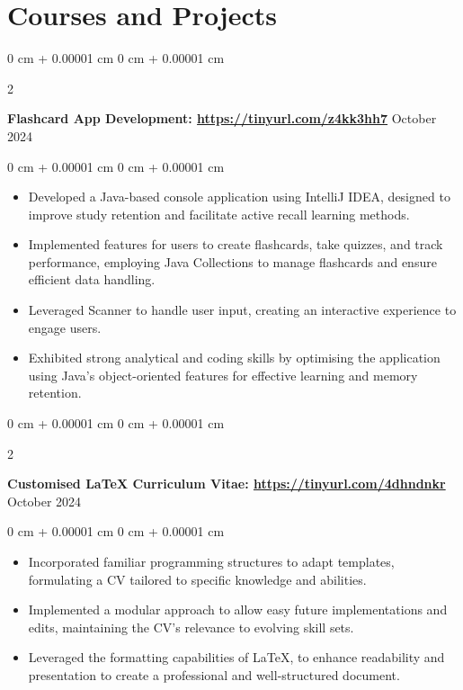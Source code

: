 \documentclass[10pt, letterpaper]{article}
\newenvironment{highlights}{
    \begin{itemize}[
        topsep=0.10 cm,
        parsep=0.10 cm,
        partopsep=0pt,
        itemsep=0pt,
        leftmargin=0 cm + 10pt
    ]
}{
    \end{itemize}
} %
\newenvironment{onecolentry}{
    \begin{adjustwidth}{
        0 cm + 0.00001 cm
    }{
        0 cm + 0.00001 cm
    }
}{
    \end{adjustwidth}
} %
\newenvironment{twocolentry}[2][]{
    \onecolentry
    \def\secondColumn{#2}
    \setcolumnwidth{\fill, 4.5 cm}
    \begin{paracol}{2}
}{
    \switchcolumn \raggedleft \secondColumn
    \end{paracol}
    \endonecolentry
} %
\begin{document}
 \vspace{0.05 cm}
        


    
    \section{Courses and Projects}
    \begin{twocolentry}{ October 2024
        }
            \textbf{Flashcard App Development: \href{https://github.com/rw200219/my-intellij-project}{https://tinyurl.com/z4kk3hh7}}\end{twocolentry}

        \vspace{0.05 cm}
        \begin{onecolentry}
            \begin{highlights}
                \item Developed a Java-based console application using IntelliJ IDEA, designed to improve study retention and facilitate active recall learning methods.
                \item Implemented features for users to create flashcards, take quizzes, and track performance, employing Java Collections to manage flashcards and ensure efficient data handling.
                \item Leveraged Scanner to handle user input, creating an interactive experience to engage users.
                \item Exhibited strong analytical and coding skills by optimising the application using Java's object-oriented features for effective learning and memory retention.
            \end{highlights}
        \end{onecolentry}


        \vspace{0.2 cm}
    \begin{twocolentry}{ October 2024
        }
            \textbf{Customised LaTeX Curriculum Vitae: \href{https://github.com/rw200219/LaTeX-CV}{https://tinyurl.com/4dhndnkr}}\end{twocolentry}

        \vspace{0.05 cm}
        \begin{onecolentry}
            \begin{highlights}
                \item Incorporated familiar programming structures to adapt templates, formulating a CV tailored to specific knowledge and abilities.
            \item Implemented a modular approach to allow easy future implementations and edits, maintaining the CV's relevance to evolving skill sets. 
                \item Leveraged the formatting capabilities of LaTeX, to enhance readability and presentation to create a professional and well-structured document.
            \end{highlights}
        \end{onecolentry}
\end{document}
